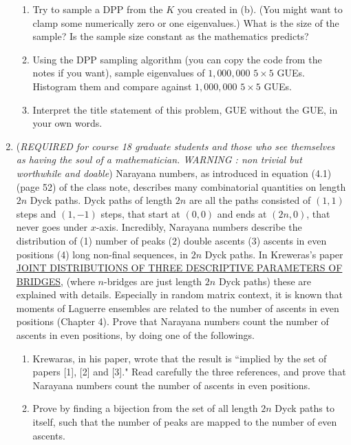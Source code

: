 \documentclass{article}
\begin{document}
\begin{enumerate}
\begin{enumerate}
        \item Try to sample a DPP from the $K$ you created in (b). (You might want to clamp some numerically zero or one eigenvalues.) What is the size of the sample? Is the sample size constant as the mathematics predicts?
        \item Using the DPP sampling algorithm (you can copy the code from the notes if you want), sample eigenvalues of $1,000,000$ $5\times 5$ GUEs. Histogram them and compare against $1,000,000$ $5\times 5$ GUEs. 
        \item Interpret the title statement of this problem, GUE without the GUE, in your own words. 
    \end{enumerate}
    \item ({\it REQUIRED for course 18 graduate students and those who see themselves as having the soul of a mathematician. WARNING : non trivial but worthwhile and doable}) Narayana numbers, as introduced in equation (4.1) (page 52) of the class note, describes many combinatorial quantities on length $2n$ Dyck paths. Dyck paths of length $2n$ are all the paths consisted of $(1, 1)$ steps and $(1, -1)$ steps, that start at $(0, 0)$ and ends at $(2n, 0)$, that never goes under $x$-axis. Incredibly, Narayana numbers describe the distribution of (1) number of peaks (2) double ascents (3) ascents in even positions (4) long non-final sequences, in $2n$ Dyck paths. In Kreweras's paper \href{https://link.springer.com/content/pdf/10.1007/BFb0072516.pdf}{\color{blue} JOINT DISTRIBUTIONS OF THREE DESCRIPTIVE PARAMETERS OF BRIDGES}, (where $n$-bridges are just length $2n$ Dyck paths) these are explained with details. Especially in random matrix context, it is known that moments of Laguerre ensembles are related to the number of ascents in even positions (Chapter 4). Prove that Narayana numbers count the number of ascents in even positions, by doing one of the followings.
    \begin{enumerate}
        \item Krewaras, in his paper, wrote that the result is ``implied by the set of papers [1], [2] and [3]." Read carefully the three references, and prove that Narayana numbers count the number of ascents in even positions. 
        \item Prove by finding a bijection from the set of all length $2n$ Dyck paths to itself, such that the number of peaks are mapped to the number of even ascents. 
    \end{enumerate}
\end{enumerate}


 
\end{document}
